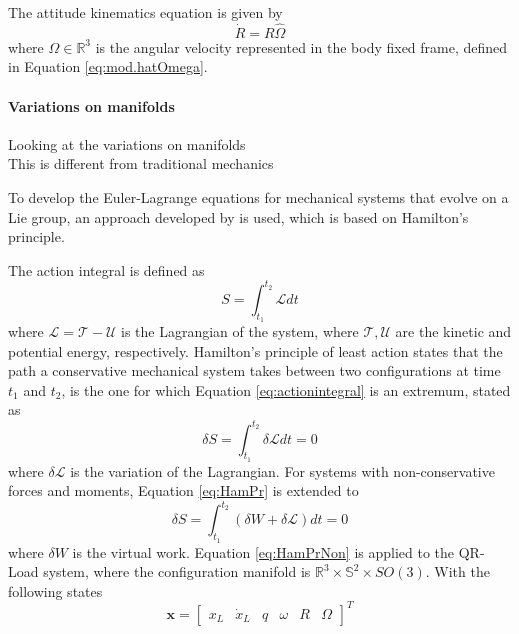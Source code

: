 The attitude kinematics equation is given by
\begin{equation}\label{key}
\dot{R}=R\hat{\Omega}
\end{equation}
where $ \Omega\in\mathbb{R}^3 $ is the angular velocity represented in the body fixed frame, defined in Equation \ref{eq:mod.hatOmega}.

\paragraph{Variations on manifolds}

Looking at the variations on manifolds\\
This is different from traditional mechanics

To develop the Euler-Lagrange equations for mechanical systems that evolve on a Lie group, an approach developed by \cite{Lee2008,Lee2005,Lee2009,Lee2011} is used, which is based on Hamilton's principle. 


The action integral is defined as
\begin{equation}\label{eq:actionintegral}
S=\int_{t_1}^{t_2}\mathcal{L}dt
\end{equation}
where $\mathcal{L}=\mathcal{T}-\mathcal{U} $ is the Lagrangian of the system, where $\mathcal{T},\mathcal{U}$ are the kinetic and potential energy, respectively. Hamilton's principle of least action states that the path a conservative mechanical system takes between two configurations at time $ t_1 $ and $ t_2 $, is the one for which Equation \ref{eq:actionintegral} is an extremum, stated as
\begin{equation}\label{eq:HamPr}
\delta S=\int_{t_1}^{t_2}\delta\mathcal{L}dt=0
\end{equation}
where $ \delta\mathcal{L} $ is the variation of the Lagrangian. For systems with non-conservative forces and moments, Equation \ref{eq:HamPr} is extended to
\begin{equation}\label{eq:HamPrNon}
\delta S=\int_{t_1}^{t_2}(\delta W+\delta\mathcal{L})dt=0
\end{equation}
where $ \delta W $ is the virtual work. Equation \ref{eq:HamPrNon} is applied to the QR-Load system, where the configuration manifold is $ \mathbb{R}^3\times \mathbb{S}^2\times SO(3) $. With the following states
\begin{equation}\label{key}
\textbf{x}= \begin{bmatrix}x_L& \dot{x}_L& q& \omega&R&\Omega
\end{bmatrix}^T
\end{equation}


